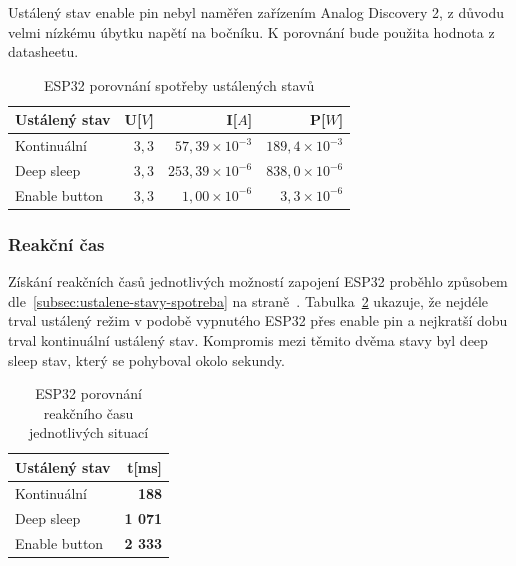 \documentclass[a4paper, 12pt]{report}
\begin{document}
    Ustálený stav enable pin nebyl naměřen zařízením Analog Discovery 2, z důvodu velmi nízkému úbytku napětí na bočníku.
    K porovnání bude použita hodnota z datasheetu.
    \begin{table}[h!]
        \centering
        \caption{ESP32 porovnání spotřeby ustálených stavů}
        \begin{tabular}{||l|r r r||}
            \hline
            Ustálený stav & U[$V$] & I[$A$]                  & P[$W$]                 \\
            \hline
            Kontinuální   & $3,3$  & $57,39 \times 10^{-3}$  & $189,4 \times 10^{-3}$ \\
            Deep sleep    & $3,3$  & $253,39 \times 10^{-6}$ & $838,0 \times 10^{-6}$ \\
            Enable button & $3,3$  & $1,00\times 10^{-6}$    & $3,3\times 10^{-6}$    \\
            \hline
        \end{tabular}
        \label{tab:esp32-klidove-rezimy-spotreba}
    \end{table}

    \subsubsection{Reakční čas}
    Získání reakčních časů jednotlivých možností zapojení ESP32 proběhlo způsobem dle~\ref{subsec:ustalene-stavy-spotreba} na straně~\pageref{subsec:ustalene-stavy-spotreba}.
    Tabulka~\ref{tab:esp32-klidove-rezimy-cas} ukazuje, že nejdéle trval ustálený režim v podobě vypnutého ESP32 přes enable pin a nejkratší dobu trval kontinuální ustálený stav.
    Kompromis mezi těmito dvěma stavy byl deep sleep stav, který se pohyboval okolo sekundy.

    \begin{table}[h]
        \centering
        \caption{ESP32 porovnání reakčního času jednotlivých situací}
        \begin{tabular}{||l|r||}
            \hline
            Ustálený stav & t[ms]           \\
            \hline
            Kontinuální   & \textbf{188}    \\
            Deep sleep    & \textbf{1 071} \\
            Enable button & \textbf{2 333} \\
            \hline
        \end{tabular}
        \label{tab:esp32-klidove-rezimy-cas}
    \end{table}
\end{document}
